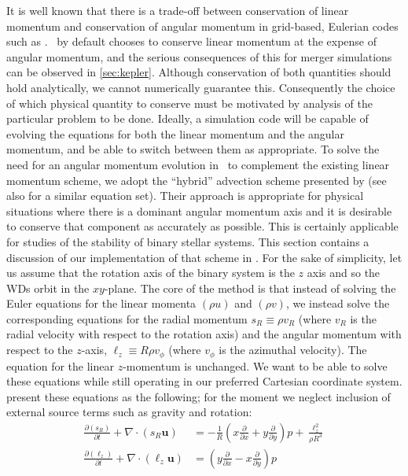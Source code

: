 \documentclass[12pt]{article}
\begin{document}
It is well known that there is a trade-off between conservation of linear
momentum and conservation of angular momentum in grid-based, Eulerian codes
such as \castro. \castro\ by default chooses to conserve linear momentum
at the expense of angular momentum, and the serious consequences of this for
merger simulations can be observed in \autoref{sec:kepler}. Although conservation
of both quantities should hold analytically, we cannot numerically guarantee this.
Consequently the choice of which physical quantity to conserve must be motivated
by analysis of the particular problem to be done. Ideally, a simulation code will
be capable of evolving the equations for both the linear momentum and the angular
momentum, and be able to switch between them as appropriate.
To solve the need for an angular momentum evolution in \castro\ to complement the
existing linear momentum scheme, we adopt the ``hybrid''
advection scheme presented by \cite{byerly:2014} (see also \cite{motl:2002} for
a similar equation set). Their approach is appropriate for physical situations
where there is a dominant angular momentum axis and it is desirable to conserve
that component as accurately as possible. This is certainly applicable for
studies of the stability of binary stellar systems. This section contains a
discussion of our implementation of that scheme in \castro. For the sake
of simplicity, let us assume that the rotation axis of the binary system is the $z$
axis and so the WDs orbit in the $xy$-plane. The core of the method is that instead
of solving the Euler equations for the linear momenta $(\rho u)$ and $(\rho v)$,
we instead solve the corresponding equations for the radial momentum
$s_R \equiv \rho v_R$ (where $v_R$ is the radial velocity with respect to the
rotation axis) and the angular momentum with respect to the $z$-axis,
$\ell_z \equiv R\rho v_\phi$ (where $v_\phi$ is the azimuthal velocity).
The equation for the linear $z$-momentum is unchanged. We want to be able
to solve these equations while still operating in our preferred Cartesian
coordinate system. \cite{byerly:2014} present these equations as the following;
for the moment we neglect inclusion of external source terms such as gravity and rotation:
\begin{align}
  \frac{\partial(s_R)}{\partial t} + \nabla \cdot (s_R \mathbf{u}) &=
    - \frac{1}{R}\left(x \frac{\partial}{\partial x} + y \frac{\partial}{\partial y}\right) p
    + \frac{\ell_z^2}{\rho R^3} \label{eq:radial-momentum}\\
    \frac{\partial(\ell_z)}{\partial t} + \nabla \cdot (\ell_z \mathbf{u}) &=
  \left(y\frac{\partial}{\partial x} - x \frac{\partial}{\partial y}\right) p \label{eq:angular-momentum}
\end{align}
\end{document}

